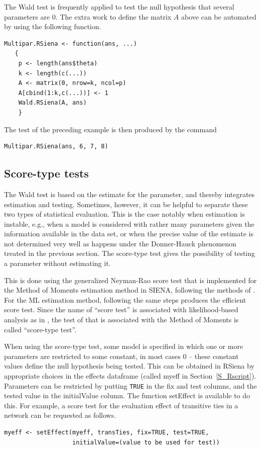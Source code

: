 \documentclass[a4paper,fleqn,11pt]{article}
\newcommand{\+}{\, + \,}
\newcommand{\sfn}[1]{\textsf{#1}}
\newcommand{\RS}{{\sf RSiena }}
\newcommand{\si}{{\sf SIENA}}
\begin{document}
The Wald test is frequently applied to test the null
hypothesis that several parameters are 0.
The extra work to define the matrix $A$ above can be automated
by using the following function.
\begin{verbatim}
Multipar.RSiena <- function(ans, ...)
   {
    p <- length(ans$theta)
    k <- length(c(...))
    A <- matrix(0, nrow=k, ncol=p)
    A[cbind(1:k,c(...))] <- 1
    Wald.RSiena(A, ans)
    }
\end{verbatim}
The test of the preceding example is then produced by the command
\begin{verbatim}
Multipar.RSiena(ans, 6, 7, 8)
\end{verbatim}


\subsection{Score-type tests}
\label{Scoretest}

The Wald test is based on the estimate for the parameter,
and thereby integrates estimation and testing.
Sometimes, however, it can be helpful to separate these two
types of statistical evaluation.
This is the case notably when estimation is instable, e.g.,
when a model is considered with rather many parameters given
the information available in the data set,
or when the precise value of the estimate is not determined
very well as happens under the Donner-Hauck phenomenon
treated in the previous section.
The score-type test gives the possibility of testing
a parameter without estimating it.

This is done using the generalized Neyman-Rao score test
that is implemented for the Method of Moments estimation method
in \si, following the methods of \citet{Schweinberger12}.
For the ML estimation method,
following the same steps produces the \citet{Rao47} efficient score test.
Since the name of ``score test'' is associated with
likelihood-based analysis as in \citet{Rao47}, the test
of  \citet{Schweinberger12} that is associated with the Method of Moments
is called ``score-type test''.

When using the score-type test, some model
is specified in which one or more parameters are restricted to some
constant, in most cases $0$ -- these constant values
define the null hypothesis being tested.
This can be obtained in \RS by appropriate choices in the effects dataframe
(called \sfn{myeff} in Section~\ref{S_Rscript}).
Parameters can be restricted by
putting \texttt{TRUE} in the \sfn{fix} and \sfn{test} columns, and
the tested value in the \sfn{initialValue} column.
The function \sfn{setEffect} is available to do this.
For example, a score test for the evaluation effect of transitive ties
in a network can be requested as follows.
\begin{verbatim}
myeff <- setEffect(myeff, transTies, fix=TRUE, test=TRUE,
                   initialValue=(value to be used for test))
\end{verbatim}
\end{document}
